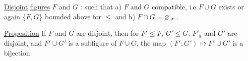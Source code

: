 \uline{Disjoint} \uline{figures}  \uline{$F$} and \uline{$G$} : such that a) $F$ and $G$ compatible, i.e $F\cup G$ exists  or again $\{F,G\}$ bounded above for $\leq$ and b) $F\cap G=\varnothing_{\mathcal F}$  .


 \uline{Proposition} If $F$ and $G$ are disjoint, then for $F'\leq F$, $G'\leq G$, $F'_{a}$ and $G'$ are disjoint, and $F'\cup G'$ is a subfigure of $F\cup G$, the map $(F';G')\mapsto F'\cup G'$ is a bijection 
